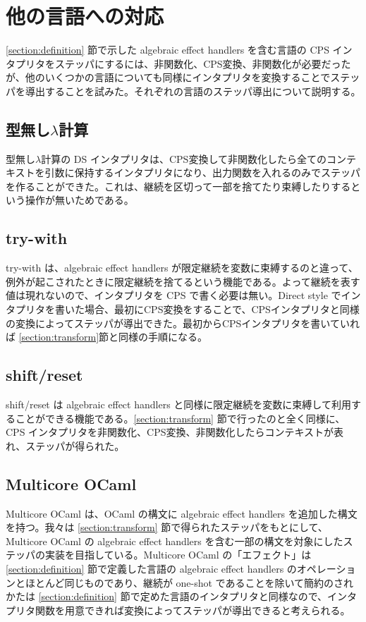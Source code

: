 \section{他の言語への対応}
\label{section:languages}

\ref{section:definition} 節で示した algebraic effect handlers を含む言語の CPS インタプリタをステッパにするには、非関数化、CPS変換、非関数化が必要だったが、他のいくつかの言語についても同様にインタプリタを変換することでステッパを導出することを試みた。それぞれの言語のステッパ導出について説明する。


\subsection{型無し$\lambda$計算}
\label{subsection:lambda}

型無し$\lambda$計算の DS インタプリタは、CPS変換して非関数化したら全てのコンテキストを引数に保持するインタプリタになり、出力関数を入れるのみでステッパを作ることができた。これは、継続を区切って一部を捨てたり束縛したりするという操作が無いためである。


\subsection{try-with}
\label{subsection:try_with}

try-with は、algebraic effect handlers が限定継続を変数に束縛するのと違って、例外が起こされたときに限定継続を捨てるという機能である。よって継続を表す値は現れないので、インタプリタを CPS で書く必要は無い。Direct style でインタプリタを書いた場合、最初にCPS変換をすることで、CPSインタプリタと同様の変換によってステッパが導出できた。最初からCPSインタプリタを書いていれば \ref{section:transform}節と同様の手順になる。


\subsection{shift/reset}
\label{subsection:shift/reset}

shift/reset は algebraic effect handlers と同様に限定継続を変数に束縛して利用することができる機能である。\ref{section:transform} 節で行ったのと全く同様に、CPS インタプリタを非関数化、CPS変換、非関数化したらコンテキストが表れ、ステッパが得られた。


\subsection{Multicore OCaml}
\label{subsection:multicore_ocaml}

Multicore OCaml は、OCaml の構文に algebraic effect handlers を追加した構文を持つ。我々は \ref{section:transform} 節で得られたステッパをもとにして、Multicore OCaml の algebraic effect handlers を含む一部の構文を対象にしたステッパの実装を目指している。Multicore OCaml の「エフェクト」は \ref{section:definition} 節で定義した言語の algebraic effect handlers のオペレーションとほとんど同じものであり、継続が one-shot であることを除いて簡約のされかたは \ref{section:definition} 節で定めた言語のインタプリタと同様なので、インタプリタ関数を用意できれば変換によってステッパが導出できると考えられる。
